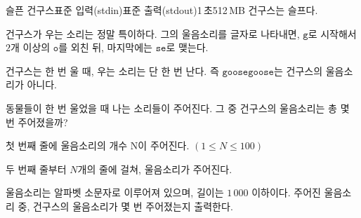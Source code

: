 \begin{problem}{슬픈 건구스}{표준 입력(stdin)}{표준 출력(stdout)}{1\,초}{512\,MB}
건구스는 슬프다.

건구스가 우는 소리는 정말 특이하다. 그의 울음소리를 글자로 나타내면, $\texttt{g}$로 시작해서 $2$개 이상의 $\texttt{o}$를 외친 뒤, 마지막에는 $\texttt{se}$로 맺는다.

건구스는 한 번 울 때, 우는 소리는 단 한 번 난다. 즉 $\texttt{goosegoose}$는 건구스의 울음소리가 아니다.

동물들이 한 번 울었을 때 나는 소리들이 주어진다. 그 중 건구스의 울음소리는 총 몇 번 주어졌을까?

\InputFile
첫 번째 줄에 울음소리의 개수 N이 주어진다. $(1 \le N \le 100)$

두 번째 줄부터 $N$개의 줄에 걸쳐, 울음소리가 주어진다. 

울음소리는 알파벳 소문자로 이루어져 있으며, 길이는 $1\,000$ 이하이다.
\OutputFile
주어진 울음소리 중, 건구스의 울음소리가 몇 번 주어졌는지 출력한다.
\Examples

\begin{example}
%
\end{example}

\end{problem}
